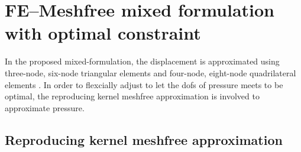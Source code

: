 \section{FE--Meshfree mixed formulation with optimal constraint}

In the proposed mixed-formulation, the displacement is approximated using three-node, six-node triangular elements and four-node, eight-node quadrilateral elements \cite{hughes2000}. In order to flexcially adjust to let the dofs of pressure meets to be optimal, the reproducing kernel meshfree approximation is involved to approximate pressure.

\subsection{Reproducing kernel meshfree approximation}

